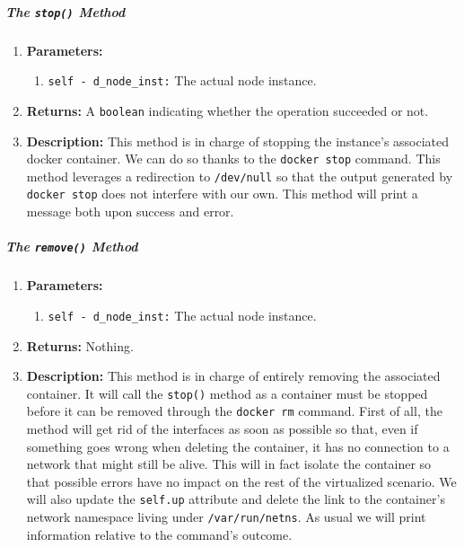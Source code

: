                     \subparagraph{The \texttt{stop()} Method}
                        \begin{enumerate}
                            \item \textbf{Parameters:}
                            \begin{enumerate}
                                \item \texttt{self - d\_node\_inst:} The actual node instance.
                            \end{enumerate}
                            \item \textbf{Returns:} A \texttt{boolean} indicating whether the operation succeeded or not.
                            \item \textbf{Description:} This method is in charge of stopping the instance's associated docker container. We can do so thanks to the \texttt{docker stop} command. This method leverages a redirection to \texttt{/dev/null} so that the output generated by \texttt{docker stop} does not interfere with our own. This method will print a message both upon success and error.
                        \end{enumerate}

                    \subparagraph{The \texttt{remove()} Method}
                        \begin{enumerate}
                            \item \textbf{Parameters:}
                            \begin{enumerate}
                                \item \texttt{self - d\_node\_inst:} The actual node instance.
                            \end{enumerate}
                            \item \textbf{Returns:} Nothing.
                            \item \textbf{Description:} This method is in charge of entirely removing the associated container. It will call the \texttt{stop()} method as a container must be stopped before it can be removed through the \texttt{docker rm} command. First of all, the method will get rid of the interfaces as soon as possible so that, even if something goes wrong when deleting the container, it has no connection to a network that might still be alive. This will in fact isolate the container so that possible errors have no impact on the rest of the virtualized scenario. We will also update the \texttt{self.up} attribute and delete the link to the container's network namespace living under \texttt{/var/run/netns}. As usual we will print information relative to the command's outcome.
                        \end{enumerate}


